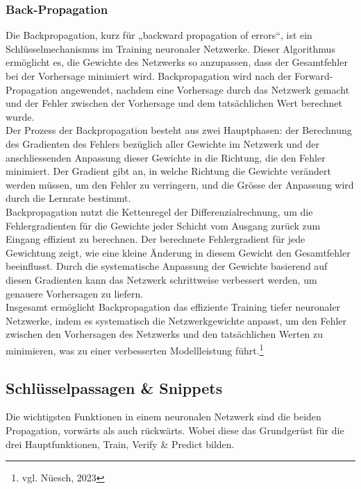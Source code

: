 \subsubsection{Back-Propagation}
\label{sec:RealBackPropagation}
Die Backpropagation, kurz für „backward propagation of errors“, ist ein Schlüsselmechanismus im Training neuronaler Netzwerke. Dieser Algorithmus ermöglicht es, die Gewichte des Netzwerks so anzupassen, dass der Gesamtfehler bei der Vorhersage minimiert wird. Backpropagation wird nach der Forward-Propagation angewendet, nachdem eine Vorhersage durch das Netzwerk gemacht und der Fehler zwischen der Vorhersage und dem tatsächlichen Wert berechnet wurde.
\\
Der Prozess der Backpropagation besteht aus zwei Hauptphasen: der Berechnung des Gradienten des Fehlers bezüglich aller Gewichte im Netzwerk und der anschliessenden Anpassung dieser Gewichte in die Richtung, die den Fehler minimiert. Der Gradient gibt an, in welche Richtung die Gewichte verändert werden müssen, um den Fehler zu verringern, und die Grösse der Anpassung wird durch die Lernrate bestimmt.
\\
Backpropagation nutzt die Kettenregel der Differenzialrechnung, um die Fehlergradienten für die Gewichte jeder Schicht vom Ausgang zurück zum Eingang effizient zu berechnen. Der berechnete Fehlergradient für jede Gewichtung zeigt, wie eine kleine Änderung in diesem Gewicht den Gesamtfehler beeinflusst. Durch die systematische Anpassung der Gewichte basierend auf diesen Gradienten kann das Netzwerk schrittweise verbessert werden, um genauere Vorhersagen zu liefern.
\\
Insgesamt ermöglicht Backpropagation das effiziente Training tiefer neuronaler Netzwerke, indem es systematisch die Netzwerkgewichte anpasst, um den Fehler zwischen den Vorhersagen des Netzwerks und den tatsächlichen Werten zu minimieren, was zu einer verbesserten Modellleistung führt.\footnote{vgl. Nüesch, 2023}

\subsection{Schlüsselpassagen \& Snippets} %
\label{sec:RealSnippetsCode}
Die wichtigsten Funktionen in einem neuronalen Netzwerk sind die beiden Propagation, vorwärts als auch rückwärts. Wobei diese das Grundgerüst für die drei Hauptfunktionen, Train, Verify \& Predict bilden.

